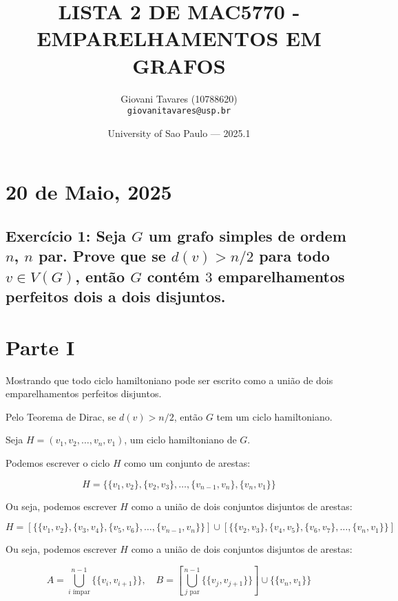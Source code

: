\documentclass{article}
\title{LISTA 2 DE MAC5770 - EMPARELHAMENTOS EM GRAFOS} %
\author{Giovani Tavares (10788620)\\ \texttt{giovanitavares@usp.br}} %
\date{University of Sao Paulo --- 2025.1} %
\begin{document}
\maketitle %


\section{20 de Maio, 2025} %


 \subsection{Exercício 1:  Seja $G$ um grafo simples de ordem $n$, $n$ par. Prove que se $d(v) > n/2$ para todo $v \in V (G)$, então $G$ contém $3$ emparelhamentos perfeitos dois a dois disjuntos.}
 
 \section*{Parte I}
 
 Mostrando que todo ciclo hamiltoniano pode ser escrito como a união de dois emparelhamentos perfeitos disjuntos.
 
 Pelo Teorema de Dirac, se $d(v) > n/2$, então $G$ tem um ciclo hamiltoniano.
 
 Seja $H = (v_1, v_2, \ldots, v_n, v_1)$, um ciclo hamiltoniano de $G$.
 
 Podemos escrever o ciclo $H$ como um conjunto de arestas:
 
 $$
 H = \{ \{v_1, v_2\}, \{v_2, v_3\}, \ldots, \{v_{n-1}, v_n\}, \{v_n, v_1\} \}
 $$
 
 Ou seja, podemos escrever $H$ como a união de dois conjuntos disjuntos de arestas:
 
 $$
 H = \left[ \{ \{v_1, v_2\}, \{v_3, v_4\}, \{v_5, v_6\}, \ldots, \{v_{n-1}, v_n\} \} \right] \cup
 \left[ \{ \{v_2, v_3\}, \{v_4, v_5\}, \{v_6, v_7\}, \ldots, \{v_n, v_1\} \} \right]
 $$
 
 Ou seja, podemos escrever $H$ como a união de dois conjuntos disjuntos de arestas:
 
 $$
 A = \bigcup_{i \text{ ímpar}}^{n-1} \{ \{v_i, v_{i+1}\} \}, \quad 
 B = [\bigcup_{j \text{ par}}^{n-1} \{ \{v_j, v_{j+1}\} \}] \cup \{ \{v_n, v_1\} \}
 $$
 
\end{document}

